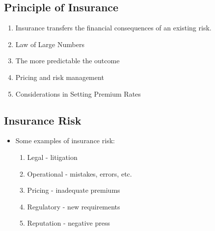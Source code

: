 \subsection{Principle of Insurance}
\begin{enumerate}
\item Insurance transfers the financial consequences of an existing risk.
\item Law of Large Numbers
\item The more predictable the outcome
\item Pricing and risk management
\item Considerations in Setting Premium Rates
\end{enumerate}


\subsection{Insurance Risk}
\begin{itemize}
	\item Some examples of insurance risk:
	\begin{enumerate}
		\item Legal - litigation
		\item Operational - mistakes, errors, etc.
		\item Pricing - inadequate premiums
        \item Regulatory - new requirements
        \item Reputation - negative press
	\end{enumerate}
\end{itemize}



